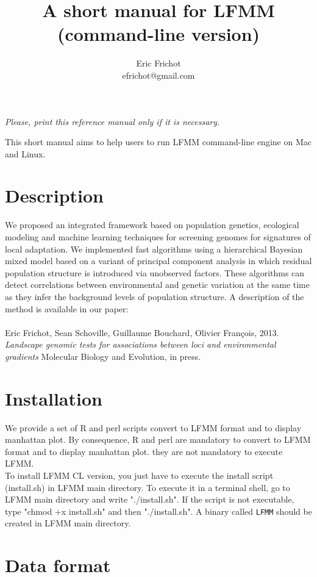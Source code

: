 \documentclass[10pt,a4paper]{article}
\title{\bf \Large A short manual for LFMM\\
\large (command-line version)
}
\author{
        Eric Frichot\\efrichot@gmail.com\\
}
\begin{document}
\maketitle
\begin{center}
{\it Please, print this reference manual only if it is necessary.}
\end{center}

\noindent
This short manual aims to help users to run LFMM command-line engine on Mac and Linux. 

\section{Description} 
We proposed an integrated framework based on population genetics, ecological modeling and machine 
learning techniques for screening genomes for signatures of local adaptation. We implemented fast 
algorithms using a hierarchical Bayesian mixed model based on a variant of principal component 
analysis in which residual population structure is introduced via unobserved factors. These 
algorithms can detect correlations between environmental and genetic variation at the same time 
as they infer the background levels of population structure. A description of the method is available in our paper:
\\
\\
\noindent
Eric Frichot, Sean Schoville, Guillaume Bouchard, Olivier François, 2013. {\it Landscape genomic tests for associations between loci and environmental gradients} Molecular Biology and Evolution, in press. 

\section{Installation} 

We provide a set of R and perl scripts convert to LFMM format and to display manhattan plot.
By consequence, R and perl are mandatory to convert to LFMM format and to display manhattan plot. 
they are not mandatory to execute LFMM.
\\
\noindent
To install LFMM CL version, you just have to execute the install script (install.sh) 
in LFMM main directory.
To execute it in a terminal shell, go to LFMM main directory and write "./install.sh".
If the script is not executable, type "chmod +x install.sh" and then "./install.sh".
A binary called \verb|LFMM| should be created in LFMM main directory.

\section{Data format}
\end{document}
